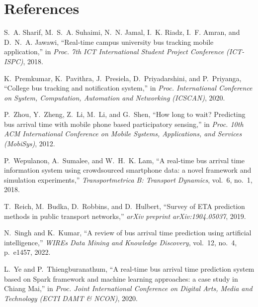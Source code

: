 \chapter*{References}

\begin{enumerate}[label={[\arabic*]}, leftmargin=1.2cm, itemsep=6pt]
  \item S.~A. Sharif, M.~S.~A. Suhaimi, N.~N. Jamal, I.~K. Riadz,
  I.~F. Amran, and D.~N.~A. Jawawi, ``Real-time campus university bus
  tracking mobile application,'' in \emph{Proc. 7th ICT International
  Student Project Conference (ICT-ISPC)}, 2018.

  \item K.~Premkumar, K.~Pavithra, J.~Presiela, D.~Priyadarshini, and
  P.~Priyanga, ``College bus tracking and notification system,'' in
  \emph{Proc. International Conference on System, Computation, Automation
  and Networking (ICSCAN)}, 2020.

  \item P.~Zhou, Y.~Zheng, Z.~Li, M.~Li, and G.~Shen, ``How long to wait?
  Predicting bus arrival time with mobile phone based participatory
  sensing,'' in \emph{Proc. 10th ACM International Conference on Mobile
  Systems, Applications, and Services (MobiSys)}, 2012.

  \item P.~Wepulanon, A.~Sumalee, and W.~H.~K. Lam, ``A real-time bus
  arrival time information system using crowdsourced smartphone data: a
  novel framework and simulation experiments,'' \emph{Transportmetrica B:
  Transport Dynamics}, vol.~6, no.~1, 2018.

  \item T.~Reich, M.~Budka, D.~Robbins, and D.~Hulbert, ``Survey of ETA
  prediction methods in public transport networks,'' \emph{arXiv preprint
  arXiv:1904.05037}, 2019.

  \item N.~Singh and K.~Kumar, ``A review of bus arrival time prediction
  using artificial intelligence,'' \emph{WIREs Data Mining and Knowledge
  Discovery}, vol.~12, no.~4, p.~e1457, 2022.

  \item L.~Ye and P.~Thiengburanathum, ``A real-time bus arrival time
  prediction system based on Spark framework and machine learning
  approaches: a case study in Chiang Mai,'' in \emph{Proc. Joint
  International Conference on Digital Arts, Media and Technology (ECTI
  DAMT \& NCON)}, 2020.


\end{enumerate}
